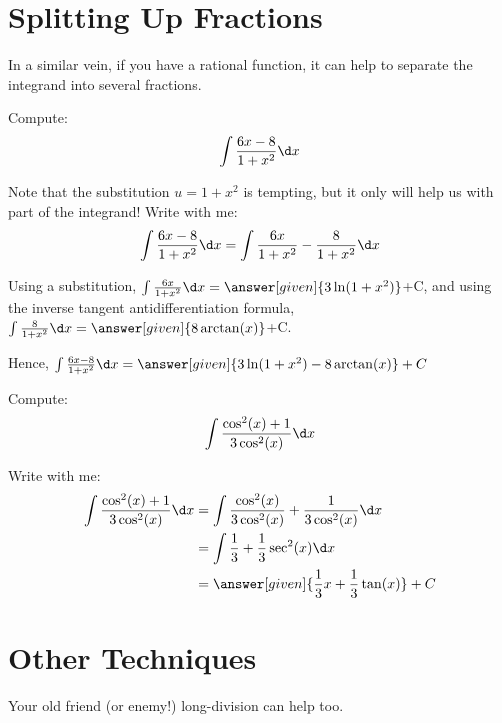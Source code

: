 \documentclass[nooutcomes]{ximera}
\begin{document}
\section{Splitting Up Fractions}

In a similar vein, if you have a rational function, it can help to separate the
integrand into several fractions.

\begin{example}
  Compute:
  \[
  \int \frac{6x-8}{1+x^2}\d x
  \]
 
  \begin{explanation}
    Note that the substitution $u= 1+x^2$ is tempting, but it only will help us with part of the integrand!  Write with me:
    \[ \int \frac{6x-8}{1+x^2}\d x = \int \frac{6x}{1+x^2}-\frac{8}{1+x^2} \d x \]
      
Using a substitution, $ \int \frac{6x}{1+x^2}\d x = \answer[given]{3 \ln(1+x^2)}$+C, and using the inverse tangent antidifferentiation formula, $ \int \frac{8}{1+x^2}\d x = \answer[given]{8 \arctan(x)}$+C.

Hence, $\int \frac{6x-8}{1+x^2}\d x =  \answer[given]{3 \ln(1+x^2)- 8 \arctan(x)}+C$
  \end{explanation}
\end{example}

\begin{example}
  Compute:
  \[
  \int \frac{\cos^2(x)+1}{3 \cos^2(x)}\d x
  \]
 
  \begin{explanation}
    Write with me:
    \begin{align*}
    \int \frac{\cos^2(x)+1}{3 \cos^2(x)}\d x &=  \int \frac{\cos^2(x)}{3 \cos^2(x)} +  \frac{1}{3 \cos^2(x)}\d x \\
    &= \int \frac{1}{3} + \frac{1}{3} \sec^2(x) \d x \\
    & = \answer[given]{\frac{1}{3}x+\frac{1}{3}\tan(x)}+C 
    \end{align*}
      
  \end{explanation}
\end{example}


\section{Other Techniques}
Your old friend (or enemy!) long-division can help too.
\end{document}
